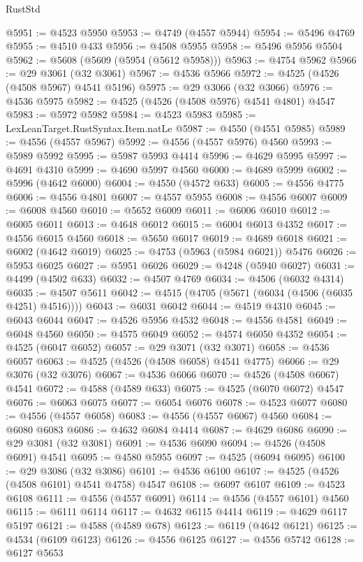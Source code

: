 \begin{lexlean}{RustStd}
\begin{coremodule}
@5951 := @4523 @5950
@5953 := @4749 (@4557 @5944)
@5954 := @5496 @4769
@5955 := @4510 @433
@5956 := @4508 @5955
@5958 := @5496 @5956 @5504
@5962 := @5608 (@5609 (@5954 (@5612 @5958)))
@5963 := @4754 @5962
@5966 := @29 @3061 (@32 @3061)
@5967 := @4536 @5966
@5972 := @4525 (@4526 (@4508 @5967) @4541 @5196)
@5975 := @29 @3066 (@32 @3066)
@5976 := @4536 @5975
@5982 := @4525 (@4526 (@4508 @5976) @4541 @4801) @4547
@5983 := @5972 @5982
@5984 := @4523 @5983
@5985 := LexLeanTarget.RustSyntax.Item.natLe
@5987 := @4550 (@4551 @5985)
@5989 := @4556 (@4557 @5967)
@5992 := @4556 (@4557 @5976) @4560
@5993 := @5989 @5992
@5995 := @5987 @5993 @4414
@5996 := @4629 @5995
@5997 := @4691 @4310
@5999 := @4690 @5997 @4560
@6000 := @4689 @5999
@6002 := @5996 (@4642 @6000)
@6004 := @4550 (@4572 @633)
@6005 := @4556 @4775
@6006 := @4556 @4801
@6007 := @4557 @5955
@6008 := @4556 @6007
@6009 := @6008 @4560
@6010 := @5652 @6009
@6011 := @6006 @6010
@6012 := @6005 @6011
@6013 := @4648 @6012
@6015 := @6004 @6013 @4352
@6017 := @4556 @6015 @4560
@6018 := @5650 @6017
@6019 := @4689 @6018
@6021 := @6002 (@4642 @6019)
@6025 := @4753 (@5963 (@5984 @6021)) @5476
@6026 := @5953 @6025
@6027 := @5951 @6026
@6029 := @4248 (@5940 @6027)
@6031 := @4499 (@4502 @633)
@6032 := @4507 @4769
@6034 := @4506 (@6032 @4314)
@6035 := @4507 @5611
@6042 := @4515 (@4705 (@5671 (@6034 (@4506 (@6035 @4251) @4516))))
@6043 := @6031 @6042
@6044 := @4519 @4310
@6045 := @6043 @6044
@6047 := @4526 @5956 @4532
@6048 := @4556 @4581
@6049 := @6048 @4560
@6050 := @4575 @6049
@6052 := @4574 @6050 @4352
@6054 := @4525 (@6047 @6052)
@6057 := @29 @3071 (@32 @3071)
@6058 := @4536 @6057
@6063 := @4525 (@4526 (@4508 @6058) @4541 @4775)
@6066 := @29 @3076 (@32 @3076)
@6067 := @4536 @6066
@6070 := @4526 (@4508 @6067) @4541
@6072 := @4588 (@4589 @633)
@6075 := @4525 (@6070 @6072) @4547
@6076 := @6063 @6075
@6077 := @6054 @6076
@6078 := @4523 @6077
@6080 := @4556 (@4557 @6058)
@6083 := @4556 (@4557 @6067) @4560
@6084 := @6080 @6083
@6086 := @4632 @6084 @4414
@6087 := @4629 @6086
@6090 := @29 @3081 (@32 @3081)
@6091 := @4536 @6090
@6094 := @4526 (@4508 @6091) @4541
@6095 := @4580 @5955
@6097 := @4525 (@6094 @6095)
@6100 := @29 @3086 (@32 @3086)
@6101 := @4536 @6100
@6107 := @4525 (@4526 (@4508 @6101) @4541 @4758) @4547
@6108 := @6097 @6107
@6109 := @4523 @6108
@6111 := @4556 (@4557 @6091)
@6114 := @4556 (@4557 @6101) @4560
@6115 := @6111 @6114
@6117 := @4632 @6115 @4414
@6119 := @4629 @6117 @5197
@6121 := @4588 (@4589 @678)
@6123 := @6119 (@4642 @6121)
@6125 := @4534 (@6109 @6123)
@6126 := @4556 @6125
@6127 := @4556 @5742
@6128 := @6127 @5653

\end{coremodule}
\end{lexlean}
